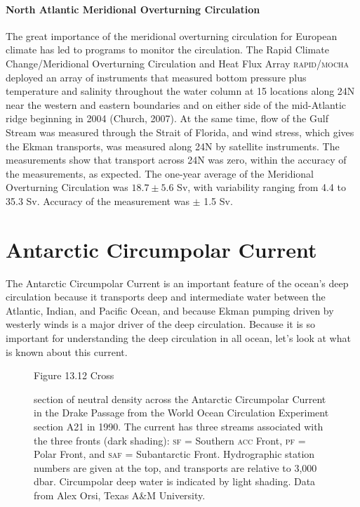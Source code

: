 \paragraph{North Atlantic Meridional Overturning Circulation}
The great importance of the meridional overturning circulation for
European climate has led to programs to monitor the circulation. The
Rapid Climate Change/Meridional Overturning Circulation and Heat Flux
Array \textsc{rapid/mocha} deployed an array of instruments that
measured bottom pressure plus temperature and salinity throughout the
water column at 15 locations along 24\degrees N near the western and
eastern boundaries and on either side of the mid-Atlantic ridge
beginning in 2004 (Church, 2007). At the same time, flow of the Gulf
Stream was measured through the Strait of Florida, and wind stress,
which gives the Ekman transports, was measured along 24\degrees N by
satellite instruments. The measurements show that transport across
24\degrees N was zero, within the accuracy of the measurements, as
expected. The one-year average of the Meridional Overturning
Circulation was $18.7 \pm 5.6$ Sv, with variability ranging from 4.4
to 35.3 Sv. Accuracy of the measurement was $\pm $ 1.5 Sv.

\section{Antarctic Circumpolar Current}
The Antarctic Circumpolar Current is an important feature of
the ocean's deep circulation because it transports deep and intermediate water between
the Atlantic, Indian, and Pacific Ocean, and because Ekman pumping
driven by westerly winds is a major driver of the deep
circulation. Because it is so important for understanding the deep
circulation in all ocean, let's look at what is known about this
current.

\begin{figure}[t!] %
{}
\footnotesize
Figure 13.12 Cross \rule{0mm}{3ex}section of neutral density across
the Antarctic Circumpolar Current in the Drake Passage from the World
Ocean Circulation Experiment
section A21 in 1990. The current has three streams associated with the
three fronts (dark shading): \textsc{sf} = Southern \textsc{acc}
Front, \textsc{pf} = Polar Front, and \textsc{saf} = Subantarctic
Front. Hydrographic station numbers are given at the top, and
transports are
relative to 3,000 dbar. Circumpolar deep water is indicated by light
shading.  Data from Alex Orsi, Texas A\&M University.

\label{fig:P16}
\vspace{-5ex}
\end{figure}

